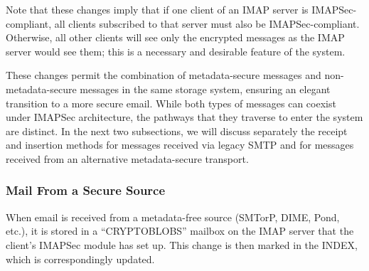 \documentclass[pageno]{jpaper}
\newcommand{\project}{IMAPSec }
\newcommand{\projectnospace}{IMAPSec}
\begin{document}

Note that these changes imply that if one client of an IMAP server is \projectnospace-compliant, all clients subscribed to that server must also be \projectnospace-compliant. Otherwise, all other clients will see only the encrypted messages as the IMAP server would see them; this is a necessary and desirable feature of the system.

These changes permit the combination of metadata-secure messages and non-metadata-secure messages in the same storage system, ensuring an elegant transition to a more secure email. While both types of messages can coexist under \project architecture, the pathways that they traverse to enter the system are distinct. In the next two subsections, we will discuss separately the receipt and insertion methods for messages received via legacy SMTP and for messages received from an alternative metadata-secure transport.

\subsubsection{Mail From a Secure Source}
\label{mail-from-secure}

When email is received from a metadata-free source (SMTorP, DIME, Pond, etc.), it is stored in a ``CRYPTOBLOBS'' mailbox on the IMAP server that the client's \project module has set up. This change is then marked in the INDEX, which is correspondingly updated.

\medskip
\end{document}

